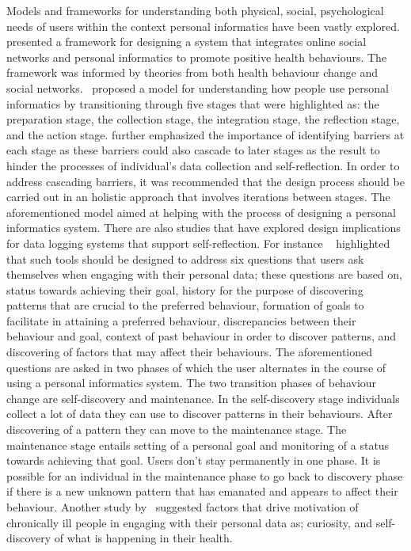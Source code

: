 Models and frameworks for understanding both physical, social, psychological needs of users within the context personal informatics have been vastly explored.~\cite{kamal2010understanding} presented a framework for designing a system that integrates online social networks and personal informatics to promote positive health behaviours. The framework was informed by theories from both health behaviour change and social networks.~\cite{li2010stage} proposed a model for understanding how people use personal informatics by transitioning through five stages that were highlighted as: the preparation stage, the collection stage, the integration stage, the reflection stage, and the action stage. \cite{li2010stage} further emphasized the importance of identifying barriers at each stage as these barriers could also cascade to later stages as the result to hinder the processes of individual’s data collection and self-reflection. In order to address cascading barriers, it was recommended that the design process should be carried out in an holistic approach that involves iterations between stages. The aforementioned model aimed at helping with the process of designing a personal informatics system. There are also studies that have explored design implications for data logging systems that support self-reflection. For instance ~\cite{li2011understanding} highlighted that such tools should be designed to address six questions that users ask themselves when engaging with their personal data; these questions are based on, status towards achieving their goal, history for the purpose of discovering patterns that are crucial to the preferred behaviour, formation of goals to facilitate in attaining a preferred behaviour, discrepancies between their behaviour and goal, context of past behaviour in order to discover patterns, and discovering of factors that may affect their behaviours. The aforementioned questions are asked in two phases of which the user alternates in the course of using a personal informatics system. The two transition phases of behaviour change are self-discovery and maintenance. In the self-discovery stage individuals collect a lot of data they can use to discover patterns in their behaviours. After discovering of a pattern they can move to the maintenance stage. The maintenance stage entails setting of a personal goal and monitoring of a status towards achieving that goal. Users don't stay permanently in one phase. It is possible for an individual in the maintenance phase to go back to discovery phase if there is a new unknown pattern that has emanated and appears to affect their behaviour. Another study by~\cite{macleod2013personal} suggested factors that drive motivation of chronically ill people in engaging with their personal data as; curiosity, and self-discovery of what is happening in their health.

